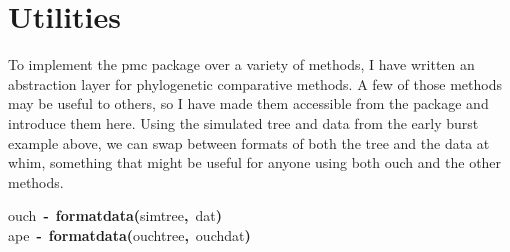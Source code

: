 \documentclass{elsarticle}
\makeatletter
\newcommand{\hlfunctioncall}[1]{\textcolor[rgb]{.5,0,.33}{\textbf{#1}}}%
\newcommand{\hlkeyword}[1]{\textbf{#1}}%
\newcommand{\hlassignement}[1]{\textbf{#1}}%
\newcommand{\hlsymbol}[1]{#1}%
\newcommand{\hlstd}[1]{\textcolor[rgb]{0,0,0}{#1}}%
\newenvironment{kframe}{%
 \def\FrameCommand##1{\hskip\@totalleftmargin \hskip-\fboxsep
 \colorbox{shadecolor}{##1}\hskip-\fboxsep
     \hskip-\linewidth \hskip-\@totalleftmargin \hskip\columnwidth}%
 \MakeFramed {\advance\hsize-\width
   \@totalleftmargin\z@ \linewidth\hsize
   \@setminipage}}%
 {\par\unskip\endMakeFramed}
\newenvironment{knitrout}{}{} %
\makeatother
\begin{document}
\section{Utilities}
To implement the pmc package over a variety of methods, I have written an abstraction layer for phylogenetic comparative methods. A few of those methods may be useful to others, so I have made them accessible from the package and introduce them here.  Using the simulated tree and data from the early burst example above, we can swap between formats of both the tree and the data at whim, something that might be useful for anyone using both ouch and the other methods.  
\begin{knitrout}
\color{fgcolor}\begin{kframe}
\begin{flushleft}
\ttfamily\noindent
\hlsymbol{ouch}{\ }\hlassignement{\usebox{\hlnormalsizeboxlessthan}-}{\ }\hlfunctioncall{format\usebox{\hlnormalsizeboxunderscore}data}\hlkeyword{(}\hlsymbol{simtree}\hlkeyword{,}{\ }\hlsymbol{dat}\hlkeyword{)}\hspace*{\fill}\\
\hlstd{}\hlsymbol{ape}{\ }\hlassignement{\usebox{\hlnormalsizeboxlessthan}-}{\ }\hlfunctioncall{format\usebox{\hlnormalsizeboxunderscore}data}\hlkeyword{(}\hlsymbol{ouch}\hlkeyword{\usebox{\hlnormalsizeboxdollar}}\hlsymbol{tree}\hlkeyword{,}{\ }\hlsymbol{ouch}\hlkeyword{\usebox{\hlnormalsizeboxdollar}}\hlsymbol{dat}\hlkeyword{)}\mbox{}
\normalfont
\end{flushleft}
\end{kframe}
\end{knitrout}
\end{document}
